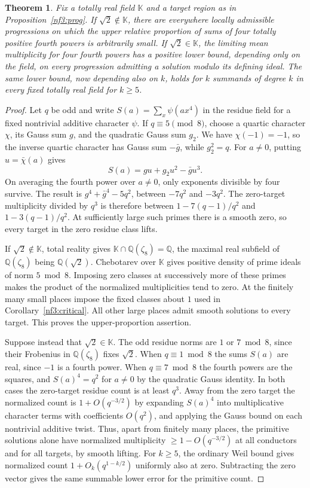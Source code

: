 \documentclass[11pt,letterpaper]{article}
\newtheorem{theorem}{Theorem}[section]
\theoremstyle{definition}
\numberwithin{equation}{section}
\begin{document}
\begin{theorem}\label{nf3:criticaldrought}
Fix a totally real field $\mathbb K$ and a target region as in
Proposition~\ref{nf3:prog}. If $\sqrt2\notin\mathbb K$, there are
everywhere locally admissible progressions on which the upper relative
proportion of sums of four totally positive fourth powers is arbitrarily
small. If $\sqrt2\in\mathbb K$, the limiting mean multiplicity for four
fourth powers has a positive lower bound, depending only on the field,
on every progression admitting a solution modulo its defining ideal.
The same lower bound, now depending also on $k$, holds for $k$ summands of
degree $k$ in every fixed totally real field for $k\ge5$.
\end{theorem}
\begin{proof}
Let $q$ be odd and write $S(a)=\sum_x\psi(ax^4)$ in the residue field
for a fixed nontrivial additive character $\psi$. If $q\equiv5\pmod8$,
choose a quartic character $\chi$, its Gauss sum $g$, and the quadratic
Gauss sum $g_2$. We have $\chi(-1)=-1$, so the inverse quartic character
has Gauss sum $-\bar g$, while $g_2^2=q$. For $a\ne0$, putting
$u=\bar\chi(a)$ gives
\[
                  S(a)=gu+g_2u^2-\bar g u^3 .
\]
On averaging the fourth power over $a\ne0$, only exponents divisible
by four survive. The result is
$g^4+\bar g^4-5q^2$, between $-7q^2$ and $-3q^2$. The zero-target
multiplicity divided by $q^3$ is therefore between
$1-7(q-1)/q^2$ and $1-3(q-1)/q^2$. At sufficiently large such primes
there is a smooth zero, so every target in the zero residue class lifts.

If $\sqrt2\notin\mathbb K$, total reality gives
$\mathbb K\cap\mathbb Q(\zeta_8)=\mathbb Q$, the maximal real subfield
of $\mathbb Q(\zeta_8)$ being $\mathbb Q(\sqrt2)$. Chebotarev over
$\mathbb K$ gives positive density of prime ideals of norm $5\bmod8$.
Imposing zero classes at successively more of these primes makes the
product of the normalized multiplicities tend to zero. At the finitely
many small places impose the fixed classes about $1$ used in
Corollary~\ref{nf3:critical}. All other large places admit smooth
solutions to every target. This proves the upper-proportion assertion.

Suppose instead that $\sqrt2\in\mathbb K$. The odd residue norms are
$1$ or $7\bmod8$, since their Frobenius in $\mathbb Q(\zeta_8)$ fixes
$\sqrt2$. When $q\equiv1\bmod8$ the sums $S(a)$ are real, since $-1$
is a fourth power. When $q\equiv7\bmod8$ the fourth powers are the
squares, and $S(a)^4=q^2$ for $a\ne0$ by the quadratic Gauss identity.
In both cases the zero-target residue count is at least $q^3$.
Away from the zero target the normalized count is $1+O(q^{-3/2})$ by expanding $S(a)^4$ into multiplicative character terms with coefficients
$O(q^2)$, and applying the Gauss bound on each nontrivial additive twist.
Thus, apart from finitely many places, the primitive solutions alone
have normalized multiplicity $\ge1-O(q^{-3/2})$ at all conductors
and for all targets, by smooth lifting. For $k\ge5$, the ordinary
Weil bound gives normalized count $1+O_k(q^{1-k/2})$ uniformly also
at zero. Subtracting the zero vector gives the same summable lower
error for the primitive count.


\end{proof}
\end{document}
